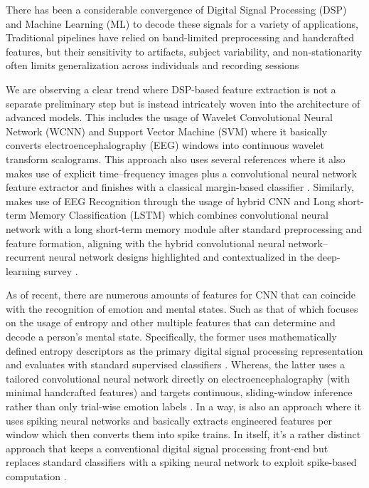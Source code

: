 \documentclass[conference]{IEEEtran}
\begin{document}
There has been a considerable convergence of Digital Signal Processing (DSP) and Machine Learning (ML) to decode these signals for a variety of applications, Traditional pipelines have relied on band-limited preprocessing and handcrafted features, but their sensitivity to artifacts, subject variability, and non-stationarity often limits generalization across individuals and recording sessions \cite{Hag2021StressHybridFS_Sensors,Hamzah2024HeliyonEEGERSurvey}

 We are observing a clear trend where DSP-based feature extraction is not a separate preliminary step but is instead intricately woven into the architecture of advanced models. This includes the usage of Wavelet Convolutional Neural Network (WCNN) and Support Vector Machine (SVM) \cite{Bagherzadeh2023HybridEEGWaveletCNN_SVM} where it basically converts electroencephalography (EEG) windows into continuous wavelet transform scalograms. This approach also uses several references where it also makes use of explicit time–frequency images plus a convolutional neural network feature extractor and finishes with a classical margin-based classifier \cite{Hag2021StressHybridFS_Sensors,Hamzah2024HeliyonEEGERSurvey}. Similarly, \cite{Chakravarthi2022EEGHybridCNNLSTM} makes use of EEG Recognition through the usage of hybrid CNN and Long short-term Memory Classification (LSTM) which combines convolutional neural network with a long short-term memory module after standard preprocessing and feature formation, aligning with the hybrid convolutional neural network–recurrent neural network designs highlighted and contextualized in the deep-learning survey \cite{Jung2022VR_Emotion_IJERPH}.

 As of recent, there are numerous amounts of features for CNN that can coincide with the recognition of emotion and mental states. Such as that of \cite{Patel2021EEGEntropyReview, Lee2020MFB_CNN_PilotMentalStates} which focuses on the usage of entropy and other multiple features that can determine and decode a person's mental state. Specifically, the former \cite{Patel2021EEGEntropyReview} uses mathematically defined entropy descriptors as the primary digital signal processing representation and evaluates with standard supervised classifiers \cite{Hamzah2024HeliyonEEGERSurvey,Chen2025AdvancesEEGEmotion_ASOC}. Whereas, the latter \cite{Lee2020MFB_CNN_PilotMentalStates} uses a tailored convolutional neural network directly on electroencephalography (with minimal handcrafted features) and targets continuous, sliding-window inference rather than only trial-wise emotion labels \cite{Hag2021StressHybridFS_Sensors}.
 In a way, \cite{Luo2020SNN_EEGEmotion} is also an approach where it uses spiking neural networks and basically extracts engineered features per window which then converts them into spike trains. In itself, it's a rather distinct approach that keeps a conventional digital signal processing front-end but replaces standard classifiers with a spiking neural network to exploit spike-based computation \cite{Wang2023DL_EEG_Review}.
\end{document}

